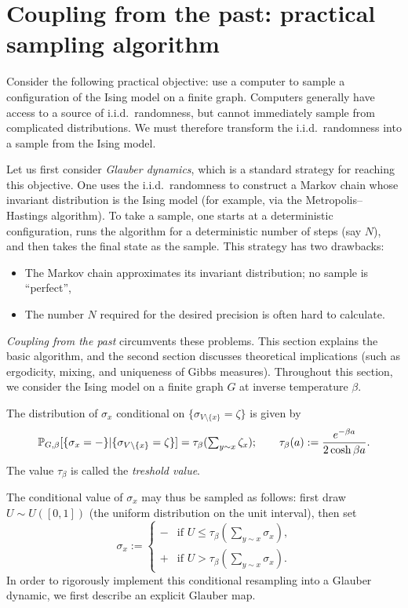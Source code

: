 \section{Coupling from the past: practical sampling algorithm}

Consider the following practical objective:
use a computer to sample a configuration of the Ising model on a finite graph.
Computers generally have access to a source of i.i.d.\ randomness,
but cannot immediately sample from complicated distributions.
We must therefore transform the i.i.d.\ randomness
into a sample from the Ising model.

Let us first consider \emph{Glauber dynamics},
which is a standard strategy for reaching this objective.
One uses the i.i.d.\ randomness
to construct a Markov chain whose invariant distribution is the Ising model
(for example, via the Metropolis--Hastings algorithm).
To take a sample, one starts at a deterministic configuration, runs the algorithm for a
deterministic number of steps (say $N$),
and then takes the final state as the sample.
This strategy has two drawbacks:
\begin{itemize}
    \item The Markov chain approximates its invariant distribution;
        no sample is ``perfect'',
    \item The number $N$ required for the desired precision is often hard to calculate.
\end{itemize}

\emph{Coupling from the past} circumvents these problems.
This section explains the basic algorithm,
and the second section discusses theoretical implications (such as ergodicity, mixing,
and uniqueness of Gibbs measures).
Throughout this section, we consider the Ising model
on a finite graph $G$ at inverse temperature $\beta$.

\begin{definition}
    The distribution of $\sigma_x$ conditional on $\{\sigma_{V\setminus\{x\}}=\zeta\}$ is given by
    \[
        \P_{G,\beta}[\{\sigma_x=-\}|\{\sigma_{V\setminus\{x\}}=\zeta\}]
        =
        \tau_\beta({\textstyle\sum_{y\sim x}\zeta_x});
        \qquad
        \tau_\beta(a):=\frac{e^{-\beta a}}{2\cosh\beta a}.
    \]
    The value $\tau_\beta$ is called the \emph{treshold value}.
\end{definition}

The conditional value of $\sigma_x$ may thus be sampled as follows:
first draw $U\sim U([0,1])$ (the uniform distribution on the unit interval),
then set
\[
    \sigma_x:=
    \begin{cases}
        - &\text{if $U\leq \tau_\beta(\sum_{y\sim x}\sigma_x)$,}\\
        + &\text{if $U> \tau_\beta(\sum_{y\sim x}\sigma_x)$.}
    \end{cases}
\]
In order to rigorously implement this conditional resampling into a Glauber dynamic,
we first describe an explicit Glauber map.

